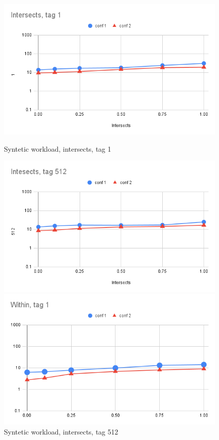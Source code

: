 \begin{figure}[h!tb]
\begin{multicols}{2}
    \includegraphics[width=\linewidth]{img/Intersects-tag-1.png}
    \caption{Syntetic workload, intersects, tag 1}\label{fig:intersects1}\par 
    \includegraphics[width=\linewidth]{img/Intesects-tag-512.png}
    \caption{Syntetic workload, intersects, tag 512}\label{fig:intersects512}\par 
\end{multicols}
\begin{multicols}{2}
    \includegraphics[width=\linewidth]{img/Within-tag-1.png}

\end{multicols}
\end{figure}
